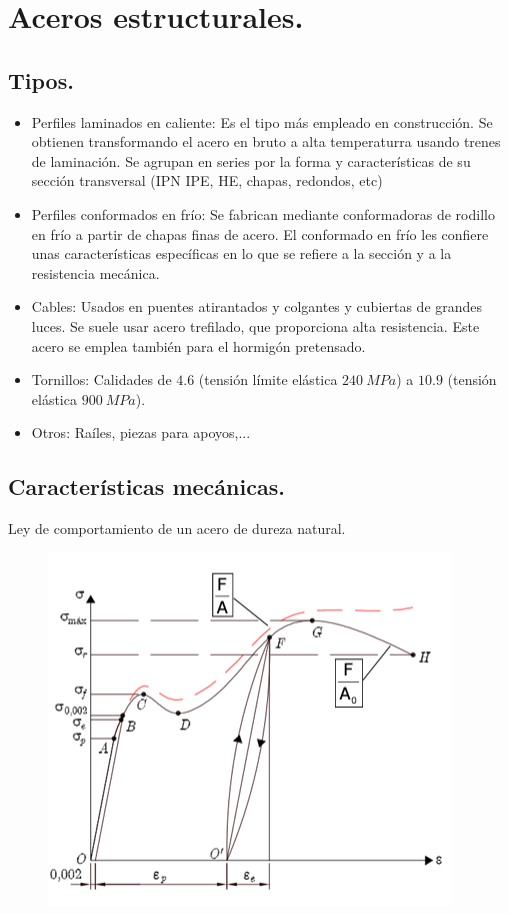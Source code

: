 \section{Aceros estructurales.}
\subsection{Tipos.}
\begin{itemize}
    \item Perfiles laminados en caliente: Es el tipo más empleado en construcción. Se obtienen transformando el acero en bruto a alta temperaturra usando trenes de laminación. Se agrupan en series por la forma y características de su sección transversal (IPN IPE, HE, chapas, redondos, etc)
    \item Perfiles conformados en frío: Se fabrican mediante conformadoras de rodillo en frío a partir de chapas finas de acero. El conformado en frío les confiere unas características específicas en lo que se refiere a la sección y a la resistencia mecánica.
    \item Cables: Usados en puentes atirantados y colgantes y cubiertas de grandes luces. Se suele usar acero trefilado, que proporciona alta resistencia. Este acero se emplea también para el hormigón pretensado.
    \item Tornillos: Calidades de $4.6$ (tensión límite elástica $240\ MPa$) a $10.9$ (tensión elástica $900\ MPa$).
    \item Otros: Raíles, piezas para apoyos,...
\end{itemize}

\subsection{Características mecánicas.}
Ley de comportamiento de un acero de dureza natural.

\begin{figure}[H]
    \centering
    \includegraphics[width = 0.5 \textwidth]{Imagenes/Ley de comportamiento de un acero de dureza natural.png}
\end{figure}

